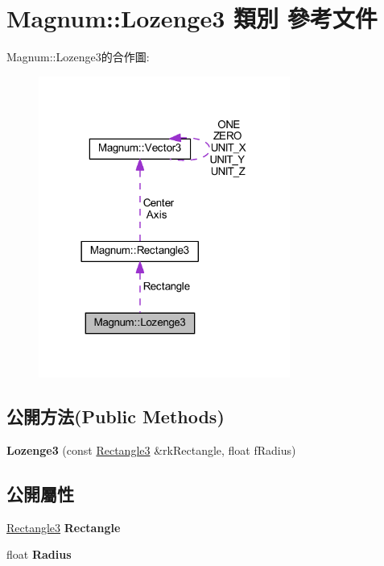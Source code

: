 \hypertarget{class_magnum_1_1_lozenge3}{}\section{Magnum\+:\+:Lozenge3 類別 參考文件}
\label{class_magnum_1_1_lozenge3}


Magnum\+:\+:Lozenge3的合作圖\+:\nopagebreak
\begin{figure}[H]
\begin{center}
\leavevmode
\includegraphics[width=234pt]{class_magnum_1_1_lozenge3__coll__graph}
\end{center}
\end{figure}
\subsection*{公開方法(Public Methods)}
\begin{DoxyCompactItemize}
\item 
{\bfseries Lozenge3} (const \hyperlink{class_magnum_1_1_rectangle3}{Rectangle3} \&rk\+Rectangle, float f\+Radius)\hypertarget{class_magnum_1_1_lozenge3_a11e4454f5a0e5dd988b268db955680a6}{}\label{class_magnum_1_1_lozenge3_a11e4454f5a0e5dd988b268db955680a6}

\end{DoxyCompactItemize}
\subsection*{公開屬性}
\begin{DoxyCompactItemize}
\item 
\hyperlink{class_magnum_1_1_rectangle3}{Rectangle3} {\bfseries Rectangle}\hypertarget{class_magnum_1_1_lozenge3_ae77b4fefab3014eb7b345d5f8bc53b4b}{}\label{class_magnum_1_1_lozenge3_ae77b4fefab3014eb7b345d5f8bc53b4b}

\item 
float {\bfseries Radius}\hypertarget{class_magnum_1_1_lozenge3_a5f26d15168b5f36882b2345c1e9d9388}{}\label{class_magnum_1_1_lozenge3_a5f26d15168b5f36882b2345c1e9d9388}

\end{DoxyCompactItemize}


